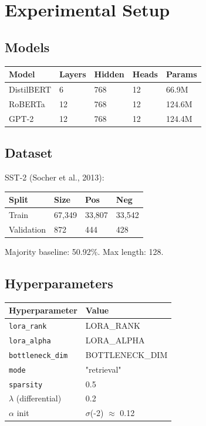 \section{Experimental Setup}

\subsection{Models}

\begin{table}[H]
\centering
\small
\begin{tabular}{lllll}
\toprule
\textbf{Model} & \textbf{Layers} & \textbf{Hidden} & \textbf{Heads} & \textbf{Params} \\
\midrule
DistilBERT & 6 & 768 & 12 & 66.9M \\
RoBERTa & 12 & 768 & 12 & 124.6M \\
GPT-2 & 12 & 768 & 12 & 124.4M \\
\bottomrule
\end{tabular}
\end{table}

\subsection{Dataset}

SST-2 (Socher et al., 2013):

\begin{table}[H]
\centering
\small
\begin{tabular}{llll}
\toprule
\textbf{Split} & \textbf{Size} & \textbf{Pos} & \textbf{Neg} \\
\midrule
Train & 67,349 & 33,807 & 33,542 \\
Validation & 872 & 444 & 428 \\
\bottomrule
\end{tabular}
\end{table}

Majority baseline: 50.92\%. Max length: 128.

\subsection{Hyperparameters}

\begin{table}[H]
\centering
\small
\begin{tabular}{ll}
\toprule
\textbf{Hyperparameter} & \textbf{Value} \\
\midrule
\texttt{lora\_rank} & {{LORA\_RANK}} \\
\texttt{lora\_alpha} & {{LORA\_ALPHA}} \\
\texttt{bottleneck\_dim} & {{BOTTLENECK\_DIM}} \\
\texttt{mode} & "retrieval" \\
\texttt{sparsity} & 0.5 \\
$\lambda$ (differential) & 0.2 \\
$\alpha$ init & $\sigma$(-2) $\approx$ 0.12 \\
\bottomrule
\end{tabular}
\end{table}

